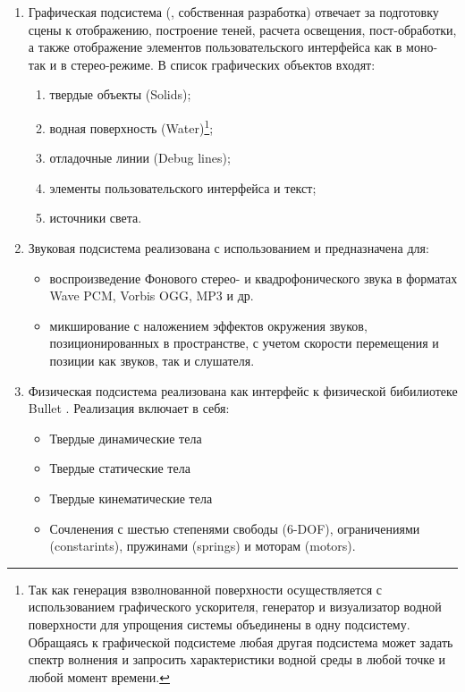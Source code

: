 \begin{enumerate}
	\item	Графическая подсистема (, собственная разработка) 
			отвечает за подготовку сцены к отображению, построение теней, 
			расчета освещения, пост-обработки, а также отображение элементов пользовательского 
			интерфейса как в моно- так и в стерео-режиме. В список графических объектов входят:
			\begin{enumerate}
			\item	твердые объекты (Solids);
			\item	водная поверхность (Water)\footnote{Так как генерация взволнованной поверхности 
					осуществляется с использованием графического ускорителя, генератор и визуализатор 
					водной поверхности для упрощения системы объединены в одну подсистему. 
					Обращаясь к графической подсистеме любая другая подсистема может задать 
					спектр волнения и запросить характеристики водной среды в любой точке и любой момент времени.};
			\item	отладочные линии (Debug lines);
			\item	элементы пользовательского интерфейса и текст;
			\item	источники света.
			\end{enumerate}
	\item	Звуковая подсистема реализована с использованием \citep{fmod} и предназначена для:
			\begin{itemize}
				\item	воспроизведение Фонового стерео- и квадрофонического звука в 
						форматах Wave PCM, Vorbis OGG, MP3 и др.
				\item	микширование с наложением эффектов окружения звуков, 
						позиционированных в пространстве, с учетом скорости 
						перемещения и позиции как звуков, так и слушателя.
			\end{itemize}

	\item	Физическая подсистема реализована как интерфейс к физической 
			бибилиотеке Bullet \citep{bullet}. Реализация включает в себя:
			\begin{itemize}
				\item 	Твердые динамические тела
				\item 	Твердые статические тела
				\item 	Твердые кинематические тела
				\item 	Сочленения с шестью степенями свободы (6-DOF), 
						ограничениями (constarints), пружинами (springs) и моторам (motors).
			\end{itemize}
	

\end{enumerate}
